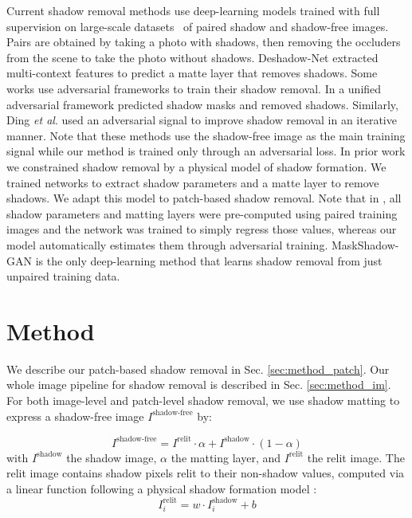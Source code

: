 \documentclass[runningheads]{llncs}
\def\etal{\emph{et al}.}
\begin{document}
Current shadow removal methods \cite{Le-etal-ICCV19,Hu_2018_CVPR,Zhang:AAA2020,Ding2019ARGANAR,Wang_2018_CVPR} use deep-learning models  trained with full supervision on large-scale datasets~\cite{Wang_2018_CVPR,Qu_2017_CVPR}  of paired shadow and shadow-free images. Pairs are obtained by taking a photo with shadows, then removing the occluders from the scene to take the photo without shadows. Deshadow-Net \cite{Qu_2017_CVPR} extracted multi-context features to predict a matte layer that removes shadows. Some works use adversarial frameworks to train their shadow removal. In \cite{Wang_2018_CVPR} a unified adversarial framework predicted shadow masks and removed shadows. Similarly, Ding \etal \cite{Ding2019ARGANAR} used an adversarial signal to improve shadow removal in an iterative manner. Note that these methods use the shadow-free image as the main training signal while our method is trained only through an adversarial loss. In prior work \cite{Le-etal-ICCV19}  we constrained shadow removal by a physical model of shadow formation. We trained networks to extract shadow parameters and a matte layer to remove shadows. We adapt this model to patch-based shadow removal. Note that in \cite{Le-etal-ICCV19}, all  shadow parameters and matting layers were pre-computed using paired training images and the network was trained to simply regress those values, whereas our model automatically estimates them through adversarial training.  MaskShadow-GAN \cite{Hu_2018_CVPR} is the only deep-learning method that learns shadow removal from just unpaired training data.

\section{Method}
We describe our patch-based shadow removal in Sec. \ref{sec:method_patch}. Our whole image pipeline for shadow removal  is described in Sec. \ref{sec:method_im}. For both image-level and patch-level shadow removal, we use  shadow matting \cite{Chuang2003,Porter1984,Smith1996,Wright} to express a shadow-free image $I^{\textrm{shadow-free}}$ by: 

\begin{equation}
    I^{\textrm{shadow-free}} =  I^{\textrm{relit}}\cdot \alpha+ I^{\textrm{shadow}} \cdot (1-\alpha )
    \label{eq:decom}
\end{equation}
with  $I^{\textrm{shadow}}$  the shadow image, $\alpha$ the matting layer, and $I^{\textrm{relit}}$ the relit image. The relit image contains shadow pixels relit to their non-shadow values,  computed via a linear function following a physical shadow formation model  \cite{Le-etal-ICCV19,Shor08}:
\begin{equation}
    I_i^{\textrm{relit}} = w \cdot I_i^{\textrm{shadow}} +b
    \label{eq:relit}
\end{equation}
\end{document}
